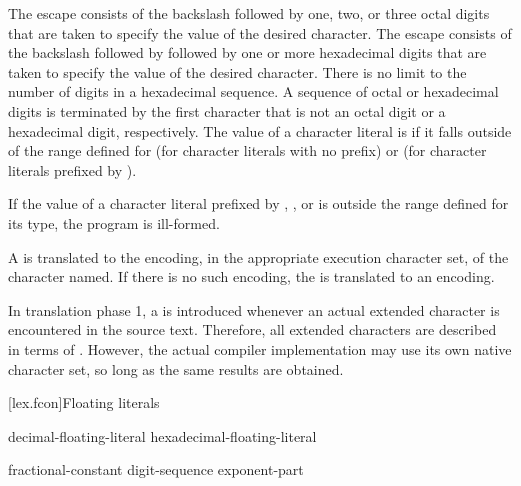 \pnum
The escape
%
 consists of the backslash followed by one,
two, or three octal digits that are taken to specify the value of the
desired character. The escape
%
consists of the backslash followed by  followed by one or more
hexadecimal digits that are taken to specify the value of the desired
character. There is no limit to the number of digits in a hexadecimal
sequence. A sequence of octal or hexadecimal digits is terminated by the
first character that is not an octal digit or a hexadecimal digit,
respectively.
%
The value of a character literal is  if it falls outside of the 
range defined for  (for character literals with no prefix) or
 (for character literals prefixed by ).
\begin{note}
If the value of a character literal prefixed by
, , or 
is outside the range defined for its type,
the program is ill-formed.
\end{note}

\pnum
A  is translated to the encoding, in the appropriate
execution character set, of the character named. If there is no such
encoding, the  is translated to an
 encoding.
\begin{note} In translation phase 1, a  is introduced whenever an
actual extended
character is encountered in the source text. Therefore, all extended
characters are described in terms of . However,
the actual compiler implementation may use its own native character set,
so long as the same results are obtained. \end{note}

[lex.fcon]{Floating literals}

%
\begin{bnf}
\br
    decimal-floating-literal\br
    hexadecimal-floating-literal
\end{bnf}

\begin{bnf}
\br
    fractional-constant  \br
    digit-sequence exponent-part 
\end{bnf}

